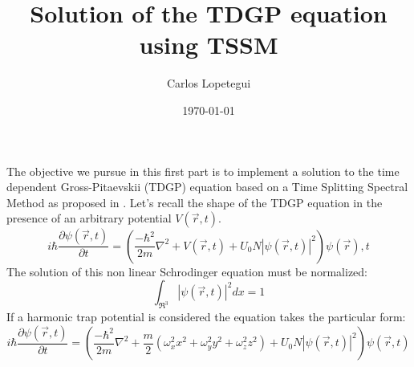 \documentclass[a4paper,10pt]{article}
\title{Solution of the TDGP equation using TSSM}
\author{Carlos Lopetegui}
\date{\today}
\begin{document}
\maketitle
The objective we pursue in this first part is to implement a solution to the time dependent Gross-Pitaevskii (TDGP) equation based on a Time Splitting Spectral Method as proposed in \cite{BaoJack}. Let's recall the shape of the TDGP equation in the presence of an arbitrary potential $V(\vec{r},t)$.
\begin{equation}\label{GP_time_Dep}
 i\hbar \frac{\partial \psi(\vec{r},t)}{\partial t}=\left(\frac{-\hbar^2}{2m}\nabla^2 +V(\vec{r},t) +U_0 N |\psi(\vec{r},t)|^2 \right)\psi(\vec{r}),t
\end{equation}
The solution of this non linear Schrodinger equation must be normalized:
\begin{equation}
 \int_{\Re^3}|\psi(\vec{r},t)|^2 dx=1
\end{equation}
If a harmonic trap potential is considered the equation takes the particular form:
\begin{equation}\label{pot_trap_GPE}\label{GP_time_Dep}
 i\hbar \frac{\partial \psi(\vec{r},t)}{\partial t}=\left(\frac{-\hbar^2}{2m}\nabla^2 +\frac{m}{2}(\omega_x^2x^2+\omega_y^2y^2+\omega_z^2 z^2) +U_0 N |\psi(\vec{r},t)|^2 \right)\psi(\vec{r},t)
\end{equation}
\end{document}
